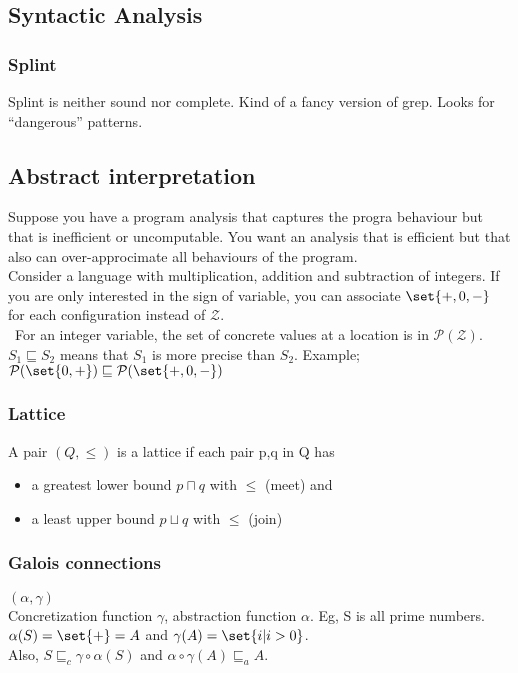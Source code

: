 \documentclass[course, english]{Notes}
\begin{document}
\subsection{Syntactic Analysis}
\subsubsection{Splint}
Splint is neither sound nor complete. Kind of a fancy version of grep. Looks for
``dangerous'' patterns.
\subsection{Abstract interpretation}
Suppose you have a program analysis that captures the progra behaviour but that
is inefficient or uncomputable. You want an analysis that is efficient but that
also can over-approcimate all behaviours of the program.
\\
Consider a language with multiplication, addition and subtraction of integers.
If you are only interested in the sign of variable, you can associate
$\set{+,0,-}$ for each configuration instead of $\mathcal{Z}$. \\\
For an integer variable, the set of concrete values at a location is in
$\mathcal{P}(\mathcal{Z})$. $S_1 \sqsubseteq S_2$ means that $S_1$ is more
precise than $S_2$. Example; $\mathcal{P}(\set{0,+}) \sqsubseteq
\mathcal{P}(\set{+,0,-})$
\subsubsection{Lattice}
A pair $(Q, \leq)$ is a lattice if each pair p,q in Q has
\begin{itemize}
	\item a greatest lower bound $p \sqcap q$ with $\leq$ (meet) and
	\item a least upper bound $p \sqcup q$ with $\leq$ (join)
\end{itemize}
\subsubsection{Galois connections}
$(\alpha,\gamma)$\\
Concretization function $\gamma$, abstraction function $\alpha$. Eg, S is all
prime numbers. $\alpha(S)
= \set{+}=A$ and $\gamma(A)=\set{i|i>0}$. \\
Also, $S\sqsubseteq_c \gamma \circ
\alpha(S)$ and $\alpha \circ \gamma(A) \sqsubseteq_a A$.
\\
\end{document}
